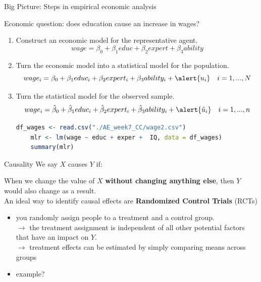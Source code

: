 \documentclass[11pt, aspectratio = 169]{beamer}
\begin{document}
\begin{frame}[fragile]{Big Picture: Steps in empirical economic analysis}
    \begin{center}
        Economic question: does education \alert{cause} an increase in wages?
    \end{center}
    \vspace{-3mm}
\pause
\vspace{+0.2cm}
\begin{enumerate}
    \item Construct an economic model for the \alert{representative agent}.
        $$wage = \beta_0 + \beta_1 educ + \beta_2 expert + \beta_3 ability $$
    \vspace{-4mm}
    \item Turn the economic model into a statistical model for the \alert{population}.
        $$wage_{i} = \beta_0 + \beta_1 educ_{i} + \beta_2 expert_{i} + \beta_3 ability_{i} + \alert{u_{i}} \quad i=1,...,N$$
    \pause
    \vspace{-4mm}
    \item Turn the statistical model for the \alert{observed sample}.
        $$wage_{i} = \hat{\beta}_0 + \hat{\beta}_1 educ_{i} + \hat{\beta}_2 expert_{i} + \hat{\beta}_3 ability_{i} + \alert{\hat{u}_{i}} \quad i=1,...,n$$
    \pause
    \vspace{-4mm}
    \begin{lstlisting}[language=R]
    df_wages <- read.csv("./AE_week7_CC/wage2.csv")
    mlr <- lm(wage ~ educ + exper +  IQ, data = df_wages)
    summary(mlr)
    \end{lstlisting}
\end{enumerate}
\end{frame}

\begin{frame}{Causality}
We say $X$ \alert{causes} $Y$ if: 

When we change the value of $X$ \textbf{without changing anything else}, then $Y$ would also change as a result.
\pause
\\
An ideal way to identify causal effects are \color{teal}\textbf{Randomized Control Trials} (RCTs)
\begin{itemize}
    \item you randomly assign people to a treatment and a control group. \\
  $\rightarrow$ the treatment assignment is independent of all other potential factors that \hspace*{+0.32cm} have an impact on $Y$. \\
$\rightarrow$ treatment effects can be estimated by simply comparing means across groups
\pause
\item example?
\end{itemize}
\end{frame}
\end{document}
